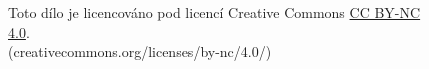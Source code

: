 \documentclass[10pt,a4paper]{article}
\date{\today}
\author{Jakub Rádl}
\makeatletter
\let\thetitle\@title
\makeatother
\begin{document}
\maketitle
\tableofcontents
\begin{figure}[b]
Toto dílo \textit{\thetitle} je licencováno pod licencí Creative Commons \href{https://creativecommons.org/licenses/by-nc/4.0/}{CC BY-NC 4.0}.\\ (creativecommons.org/licenses/by-nc/4.0/)
\end{figure}
\newpage
\end{document}
